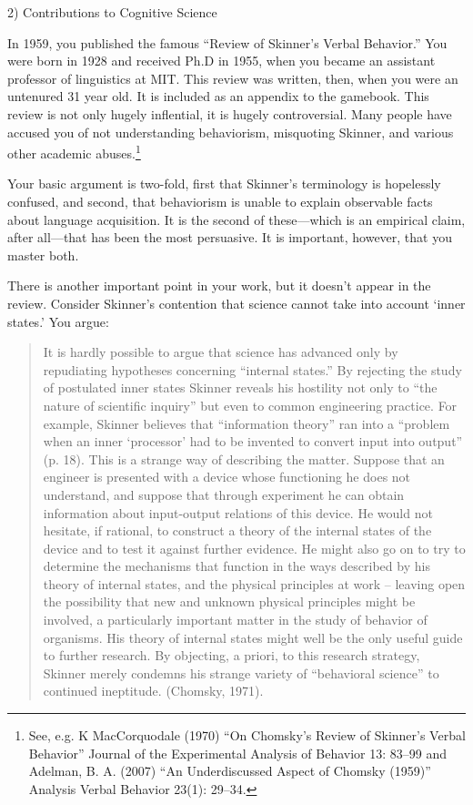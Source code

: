 \begin{refsection}
2) Contributions to Cognitive Science

In 1959, you published the famous “Review of Skinner's Verbal Behavior.” You were born in 1928 and received Ph.D in 1955, when you became an assistant professor of linguistics at MIT. This review was written, then, when you were an untenured 31 year old. It is included as an appendix to the gamebook. This review is not only hugely inflential, it is hugely controversial. Many people have accused you of not understanding behaviorism, misquoting Skinner, and various other academic abuses.\footnote{See, e.g. K MacCorquodale (1970) “On Chomsky's Review of Skinner's Verbal Behavior” Journal of the Experimental Analysis of Behavior 13: 83--99 and Adelman, B. A. (2007) “An Underdiscussed Aspect of Chomsky (1959)” Analysis Verbal Behavior 23(1): 29--34.}

Your basic argument is two-fold, first that Skinner's terminology is hopelessly confused, and second, that behaviorism is unable to explain observable facts about language acquisition. It is the second of these—which is an empirical claim, after all—that has been the most persuasive. It is important, however, that you master both.

There is another important point in your work, but it doesn't appear in the review. Consider Skinner's contention that science cannot take into account `inner states.' You argue:

\begin{quote}

It is hardly possible to argue that science has advanced only by repudiating hypotheses concerning ``internal states.'' By rejecting the study of postulated inner states Skinner reveals his hostility not only to ``the nature of scientific inquiry'' but even to common engineering practice. For example, Skinner believes that ``information theory'' ran into a ``problem when an inner `processor' had to be invented to convert input into output'' (p. 18).
This is a strange way of describing the matter. Suppose that an engineer is presented with a device whose functioning he does not understand, and suppose that through experiment he can obtain information about input-output relations of this device. He would not hesitate, if rational, to construct a theory of the internal states of the device and to test it against further evidence. He might also go on to try to determine the mechanisms that function in the ways described by his theory of internal states, and the physical principles at work -- leaving open the possibility that new and unknown physical principles might be involved, a particularly important matter in the study of behavior of organisms. His theory of internal states might well be the only useful guide to further research. By objecting, a priori, to this research strategy, Skinner merely condemns his strange variety of ``behavioral science'' to continued ineptitude. (Chomsky, 1971).
\end{quote}


\end{refsection}
